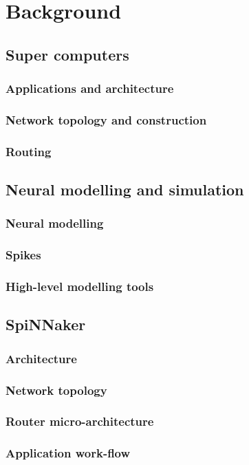 \chapter{Background}

\section{Super computers}
	\subsection{Applications and architecture}
	\subsection{Network topology and construction}
	\subsection{Routing}

\section{Neural modelling and simulation}
	\subsection{Neural modelling}
	\subsection{Spikes}
	\subsection{High-level modelling tools}

\section{SpiNNaker}
	\subsection{Architecture}
	\subsection{Network topology}
	\subsection{Router micro-architecture}
	\subsection{Application work-flow}
